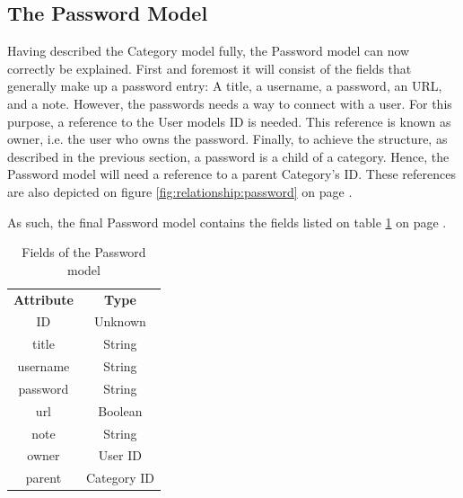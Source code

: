 
		\subsection{The Password Model}
			\label{sec:model:password}
			Having described the Category model fully, the Password model can now correctly be explained. First and foremost it will consist of the fields that generally make up a password entry: A title, a username, a password, an URL, and a note. However, the passwords needs a way to connect with a user. For this purpose, a reference to the User models ID is needed. This reference is known as owner, i.e. the user who owns the password. Finally, to achieve the structure, as described in the previous section, a password is a child of a category. Hence, the Password model will need a reference to a parent Category's ID. These references are also depicted on figure \ref{fig:relationship:password} on page \pageref{fig:relationship:password}.

			As such, the final Password model contains the fields listed on table \ref{fig:model:password} on page \pageref{fig:model:password}.

			\begin{table}[p]
				\centering
				\begin{tabular}{c|c}
					\textbf{Attribute} 		& \textbf{Type} 	\\
					ID 						& Unknown 			\\
					title 					& String 			\\
					username 				& String 			\\
					password 				& String 			\\
					url						& Boolean 			\\
					note  					& String 			\\
					owner 					& User ID 			\\
					parent 					& Category ID 		\\
				\end{tabular}
				\caption{Fields of the Password model}
				\label{fig:model:password}
			\end{table}
			
